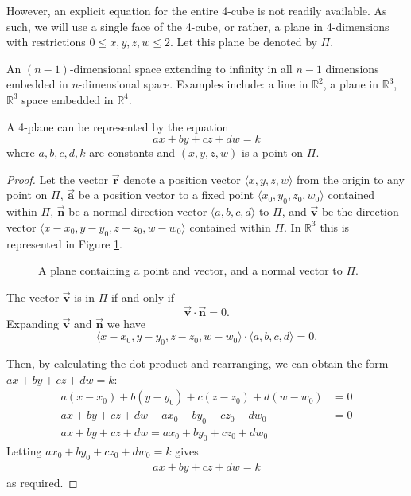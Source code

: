 However, an explicit equation for the entire 4-cube is not readily available. As such, we will use a single face of the 4-cube, or rather, a plane in 4-dimensions with restrictions $0\leq x, y, z, w \leq 2$. Let this plane be denoted by $\Pi$.
\begin{definition}[$n$-Plane]
    An $(n-1)$-dimensional space extending to infinity in all $n-1$ dimensions embedded in $n$-dimensional space. Examples include: a line in $\mathbb{R}^2$, a plane in $\mathbb{R}^3$, $\mathbb{R}^3$ space embedded in $\mathbb{R}^4$.
\end{definition}
\begin{lemma}
A 4-plane can be represented by the equation \begin{equation}\label{eq:4-plane}
    ax+by+cz+dw=k
\end{equation}
where $a, b, c, d, k$ are constants and $(x, y, z, w)$ is a point on $\Pi$. 
\end{lemma}
\begin{proof}
    Let the vector $\Vec{\mathbf{r}}$ denote a position vector $\langle x, y, z, w\rangle$ from the origin to any point on $\Pi$, $\Vec{\mathbf{a}}$ be a position vector to a fixed point $\langle x_0, y_0, z_0, w_0\rangle$ contained within $\Pi$, $\Vec{\mathbf{n}}$ be a normal direction vector $\langle a, b, c, d\rangle$ to $\Pi$, and $\Vec{\mathbf{v}}$ be the direction vector $\langle x-x_0, y-y_0, z-z_0, w-w_0\rangle$ contained within $\Pi$. In $\mathbb{R}^3$ this is represented in Figure \ref{fig:plane equation proof setup}.
    \begin{figure}[H]
        \centering
        \caption{A plane containing a point and vector, and a normal vector to $\Pi$.}
        \label{fig:plane equation proof setup}
    \end{figure}
    
    \noindent
    The vector $\Vec{\mathbf{v}}$ is in $\Pi$ if and only if $$\Vec{\mathbf{v}} \cdot \Vec{\mathbf{n}} = 0.$$ Expanding $\Vec{\mathbf{v}}$ and $\Vec{\mathbf{n}}$ we have $$\langle x-x_0, y-y_0, z-z_0, w-w_0\rangle \cdot \langle a, b, c, d\rangle = 0.$$
    
    \noindent
    Then, by calculating the dot product and rearranging, we can obtain the form $ax+by+cz+dw=k$:
    \begin{align*}
        a(x-x_0)+b(y-y_0)+c(z-z_0)+d(w-w_0) &= 0\\
        ax+by+cz+dw-ax_0-by_0-cz_0-dw_0 &= 0\\
        ax+by+cz+dw = ax_0+by_0+cz_0+dw_0
    \end{align*}
    Letting $ax_0+by_0+cz_0+dw_0=k$ gives
    \begin{align*}
        ax+by+cz+dw = k
    \end{align*}
    as required.
\end{proof}

